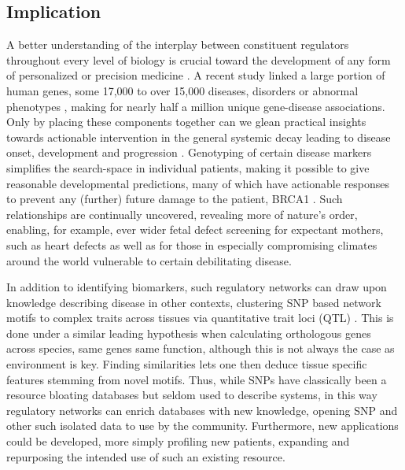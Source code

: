 \subsection{Implication}
\label{sec:practical}
A better understanding of the interplay between constituent regulators throughout every level of biology is crucial toward the development of any form of personalized or precision medicine \citep{barabasi2011network}. A recent study linked a large portion of human genes, some 17,000 to over 15,000 diseases, disorders or abnormal phenotypes \citep{pinero2015disgenet}, making for nearly half a million unique gene-disease associations. Only by placing these components together can we glean practical insights towards actionable intervention in the general systemic decay leading to disease onset, development and progression \citep{flores2013p4}. Genotyping of certain disease markers simplifies the search-space in individual patients, making it possible to give reasonable developmental predictions, many of which have actionable responses to prevent any (further) future damage to the patient, \eg BRCA1 \citep{lerman1996brca1}. Such relationships are continually uncovered, revealing more of nature's order, enabling, for example, ever wider fetal defect screening for expectant mothers, such as heart defects \citep{hyett1999using} as well as for those in especially compromising climates around the world vulnerable to certain debilitating disease.

In addition to identifying biomarkers, such regulatory networks can draw upon knowledge describing disease in other contexts, \eg clustering SNP based network motifs to complex traits across tissues via quantitative trait loci (QTL) \citep{platig2016bipartite}. This is done under a similar leading hypothesis when calculating orthologous genes across species, \ie same genes same function, although this is not always the case as environment is key. Finding similarities lets one then deduce tissue specific features stemming from novel motifs. Thus, while SNPs have classically been a resource bloating databases but seldom used to describe systems, in this way regulatory networks can enrich databases with new knowledge, opening SNP and other such isolated data to use by the community. Furthermore, new applications could be developed, \eg more simply profiling new patients, expanding and repurposing the intended use of such an existing resource. 

